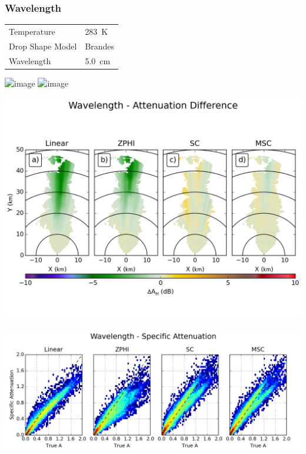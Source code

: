 \documentclass[red]{beamer}
\begin{document}
\begin{frame}
	\frametitle{Wavelength}
	\begin{center}
	    \begin{tabular}{ | l | l | }
	        \hline
	        Temperature & \SI{283}{\kelvin} \\
	        Drop Shape Model & Brandes \\
	        Wavelength & \SI{5.0}{\centi\meter} \\
			\hline
	    \end{tabular}
	\end{center}	
\end{frame}

\begin{frame}
	\begin{center}
		\includegraphics<1>[scale=0.45]{figures/C_Wavelength_Attenuation.png}
		\includegraphics<2>[scale=0.45]{figures/C_Control_Attenuation.png}
	\end{center}
\end{frame}

\begin{frame}
	\begin{center}
		\includegraphics[scale=0.45]{figures/C_Wavelength_Attenuation_Difference.png}
	\end{center}
\end{frame}

\begin{frame}
	\begin{center}
		\includegraphics[scale=0.45]{figures/C_Wavelength_Specific_Attenuation_scatter.png}
	\end{center}
\end{frame}
\end{document}
